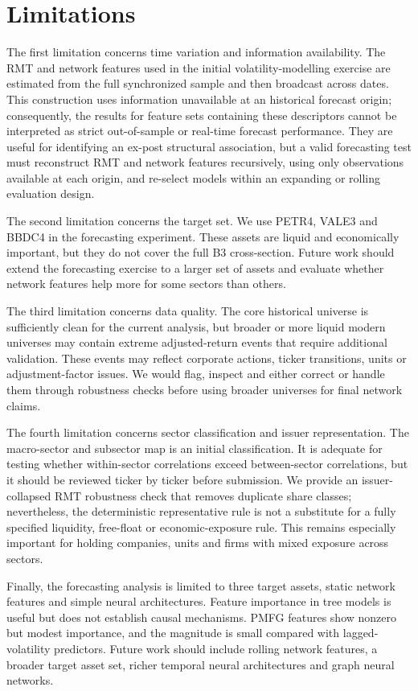 \section{Limitations}
\label{sec:limitations}

The first limitation concerns time variation and information availability. The RMT and network features used in the initial volatility-modelling exercise are estimated from the full synchronized sample and then broadcast across dates. This construction uses information unavailable at an historical forecast origin; consequently, the results for feature sets containing these descriptors cannot be interpreted as strict out-of-sample or real-time forecast performance. They are useful for identifying an ex-post structural association, but a valid forecasting test must reconstruct RMT and network features recursively, using only observations available at each origin, and re-select models within an expanding or rolling evaluation design.

The second limitation concerns the target set. We use PETR4, VALE3 and BBDC4 in the forecasting experiment. These assets are liquid and economically important, but they do not cover the full B3 cross-section. Future work should extend the forecasting exercise to a larger set of assets and evaluate whether network features help more for some sectors than others.

The third limitation concerns data quality. The core historical universe is sufficiently clean for the current analysis, but broader or more liquid modern universes may contain extreme adjusted-return events that require additional validation. These events may reflect corporate actions, ticker transitions, units or adjustment-factor issues. We would flag, inspect and either correct or handle them through robustness checks before using broader universes for final network claims.

The fourth limitation concerns sector classification and issuer representation. The macro-sector and subsector map is an initial classification. It is adequate for testing whether within-sector correlations exceed between-sector correlations, but it should be reviewed ticker by ticker before submission. We provide an issuer-collapsed RMT robustness check that removes duplicate share classes; nevertheless, the deterministic representative rule is not a substitute for a fully specified liquidity, free-float or economic-exposure rule. This remains especially important for holding companies, units and firms with mixed exposure across sectors.

Finally, the forecasting analysis is limited to three target assets, static network features and simple neural architectures. Feature importance in tree models is useful but does not establish causal mechanisms. PMFG features show nonzero but modest importance, and the magnitude is small compared with lagged-volatility predictors. Future work should include rolling network features, a broader target asset set, richer temporal neural architectures and graph neural networks.
